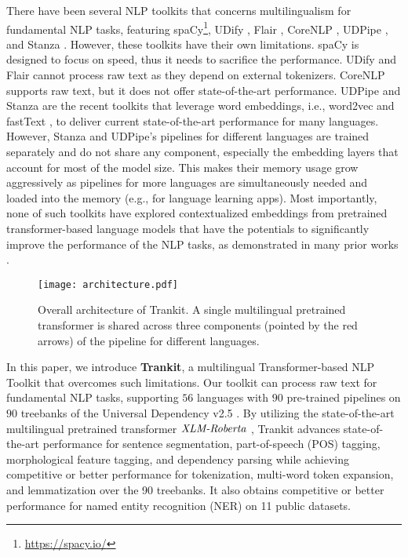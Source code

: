 \documentclass[11pt,a4paper]{article}
\begin{document}
There have been several NLP toolkits that concerns multilingualism for fundamental NLP tasks, featuring spaCy\footnote{\url{https://spacy.io/}}, UDify \citep{kondratyuk-straka-2019-75}, Flair \citep{akbik-etal-2019-flair}, CoreNLP \citep{manning-etal-2014-stanford}, UDPipe \citep{straka-2018-udpipe}, and Stanza \citep{qi-etal-2020-stanza}. However, these toolkits have their own limitations. spaCy is designed to focus on speed, thus it needs to sacrifice the performance. UDify and Flair cannot process raw text as they depend on external tokenizers. CoreNLP supports raw text, but it does not offer state-of-the-art performance. UDPipe and Stanza are the recent toolkits that leverage word embeddings, i.e., word2vec \citep{mikolov2013distributed} and fastText \citep{bojanowski-etal-2017-enriching}, to deliver current state-of-the-art performance for many languages. However, Stanza and UDPipe's pipelines for different languages are trained separately and do not share any component, especially the embedding layers that account for most of the model size. This makes their memory usage grow aggressively as pipelines for more languages are simultaneously needed and loaded into the memory (e.g., for language learning apps). Most importantly, none of such toolkits have explored contextualized embeddings from pretrained transformer-based language models that have the potentials to significantly improve the performance of the NLP tasks, as demonstrated in many prior works \citep{devlin-etal-2019-bert,liu2019roberta,conneau-etal-2020-unsupervised}.

\begin{figure*}
    \centering
\texttt{[image: architecture.pdf]}
    \caption{Overall architecture of Trankit. A single multilingual pretrained transformer is shared across three components (pointed by the red arrows) of the pipeline for different languages.}
    \label{fig:architecture}
\end{figure*}

In this paper, we introduce \textbf{Trankit}, a multilingual Transformer-based NLP Toolkit that overcomes such limitations. Our toolkit can process raw text for fundamental NLP tasks, supporting $56$ languages with $90$ pre-trained pipelines on $90$ treebanks of the Universal Dependency v2.5 \citep{11234/1-3105}. By utilizing the state-of-the-art multilingual pretrained transformer $\textrm{\textit{XLM-Roberta}}$ \citep{conneau-etal-2020-unsupervised}, Trankit advances state-of-the-art performance for sentence segmentation, part-of-speech (POS) tagging, morphological feature tagging, and dependency parsing while achieving competitive or better performance for tokenization, multi-word token expansion, and lemmatization over the 90 treebanks. It also obtains competitive or better performance for named entity recognition (NER) on 11 public datasets.
\end{document}
